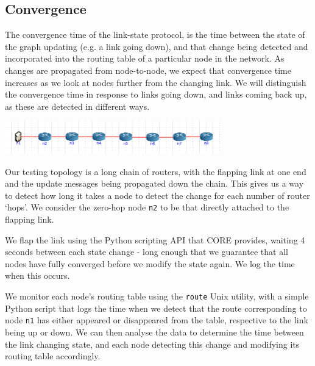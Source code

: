 \documentclass[10pt,twoside,a4paper]{article}
\begin{document}
\subsection{Convergence}

The convergence time of the link-state protocol, is the time between the state of the graph updating (e.g. a link going down), and that change being detected and incorporated into the routing table of a particular node in the network. As changes are propagated from node-to-node, we expect that convergence time increases as we look at nodes further from the changing link. We will distinguish the convergence time in response to links going down, and links coming back up, as these are detected in different ways. 

\begin{minipage}{1\textwidth} \centering
	\includegraphics[width=0.7\textwidth]{conv_topology}
	\label{fig:conv_topology}
\end{minipage}

Our testing topology is a long chain of routers, with the flapping link at one end and the update messages being propagated down the chain. This gives us a way to detect how long it takes a node to detect the change for each number of router `hops'. We consider the zero-hop node \texttt{n2} to be that directly attached to the flapping link.

We flap the link using the Python scripting API that CORE provides, waiting 4 seconds between each state change - long enough that we guarantee that all nodes have fully converged before we modify the state again. We log the time when this occurs.

We monitor each node's routing table using the \texttt{route} Unix utility, with a simple Python script that logs the time when we detect that the route corresponding to node \texttt{n1} has either appeared or disappeared from the table, respective to the link being up or down. We can then analyse the data to determine the time between the link changing state, and each node detecting this change and modifying its routing table accordingly.
\end{document}
